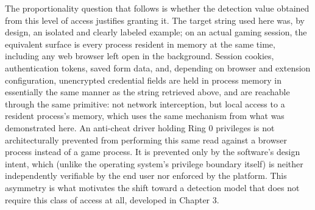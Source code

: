 The proportionality question that follows is whether the detection value obtained from this level of access justifies granting it. The target string used here was, by design, an isolated and clearly labeled example; on an actual gaming session, the equivalent surface is every process resident in memory at the same time, including any web browser left open in the background. Session cookies, authentication tokens, saved form data, and, depending on browser and extension configuration, unencrypted credential fields are held in process memory in essentially the same manner as the string retrieved above, and are reachable through the same primitive: not network interception, but local access to a resident process's memory, which uses the same mechanism from what was demonstrated here. An anti-cheat driver holding Ring 0 privileges is not architecturally prevented from performing this same read against a browser process instead of a game process. It is prevented only by the software's design intent, which (unlike the operating system's privilege boundary itself) is neither independently verifiable by the end user nor enforced by the platform. This asymmetry is what motivates the shift toward a detection model that does not require this class of access at all, developed in Chapter 3.
